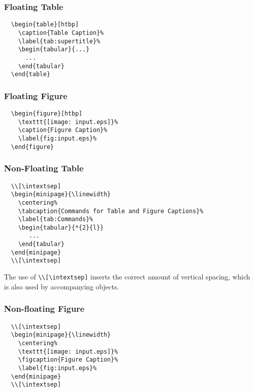 \documentclass{article}
\begin{document}
\subsubsection{Floating Table}
\begin{verbatim}
  \begin{table}[htbp]
    \caption{Table Caption}%
    \label{tab:supertitle}%
    \begin{tabular}{...}
      ...
    \end{tabular}
  \end{table}
\end{verbatim}

\subsubsection{Floating Figure}
\begin{verbatim}
  \begin{figure}[htbp]
    \texttt{[image: input.eps]}%
    \caption{Figure Caption}%
    \label{fig:input.eps}%
  \end{figure}
\end{verbatim}

\subsubsection{Non-Floating Table}
\begin{verbatim}
  \\[\intextsep]
  \begin{minipage}{\linewidth}
    \centering%
    \tabcaption{Commands for Table and Figure Captions}%
    \label{tab:Commands}%
    \begin{tabular}{*{2}{l}}
       ...
    \end{tabular}
  \end{minipage}
  \\[\intextsep]
\end{verbatim}
The use of \verb|\\[\intextsep]| inserts the correct amount of vertical spacing, which is also used by accompanying objects.

\pagebreak
\subsubsection{Non-floating Figure}
\begin{verbatim}
  \\[\intextsep]
  \begin{minipage}{\linewidth}
    \centering%
    \texttt{[image: input.eps]}%
    \figcaption{Figure Caption}%
    \label{fig:input.eps}%
  \end{minipage}
  \\[\intextsep]
\end{verbatim}
\end{document}
